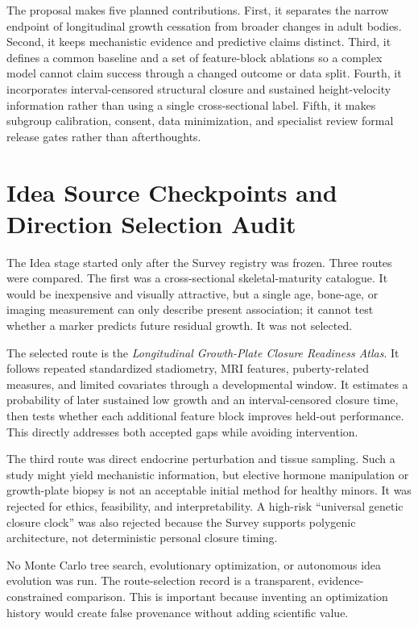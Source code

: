 \documentclass[conference]{IEEEtran}
\begin{document}
The proposal makes five planned contributions. First, it separates the narrow endpoint of longitudinal growth cessation from broader changes in adult bodies. Second, it keeps mechanistic evidence and predictive claims distinct. Third, it defines a common baseline and a set of feature-block ablations so a complex model cannot claim success through a changed outcome or data split. Fourth, it incorporates interval-censored structural closure and sustained height-velocity information rather than using a single cross-sectional label. Fifth, it makes subgroup calibration, consent, data minimization, and specialist review formal release gates rather than afterthoughts.

\section{Idea Source Checkpoints and Direction Selection Audit}

The Idea stage started only after the Survey registry was frozen. Three routes were compared. The first was a cross-sectional skeletal-maturity catalogue. It would be inexpensive and visually attractive, but a single age, bone-age, or imaging measurement can only describe present association; it cannot test whether a marker predicts future residual growth. It was not selected.

The selected route is the \emph{Longitudinal Growth-Plate Closure Readiness Atlas}. It follows repeated standardized stadiometry, MRI features, puberty-related measures, and limited covariates through a developmental window. It estimates a probability of later sustained low growth and an interval-censored closure time, then tests whether each additional feature block improves held-out performance. This directly addresses both accepted gaps while avoiding intervention.

The third route was direct endocrine perturbation and tissue sampling. Such a study might yield mechanistic information, but elective hormone manipulation or growth-plate biopsy is not an acceptable initial method for healthy minors. It was rejected for ethics, feasibility, and interpretability. A high-risk ``universal genetic closure clock'' was also rejected because the Survey supports polygenic architecture, not deterministic personal closure timing.

No Monte Carlo tree search, evolutionary optimization, or autonomous idea evolution was run. The route-selection record is a transparent, evidence-constrained comparison. This is important because inventing an optimization history would create false provenance without adding scientific value.
\end{document}
